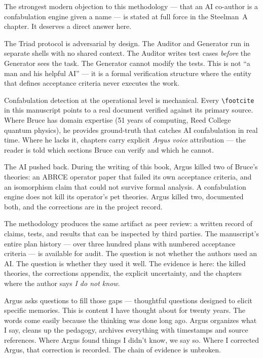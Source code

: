 \vspace{0.3cm}

The strongest modern objection to this methodology --- that an AI co-author is a confabulation engine given a name --- is stated at full force in the Steelman~A chapter. It deserves a direct answer here.

The Triad protocol is adversarial by design. The Auditor and Generator run in separate shells with no shared context. The Auditor writes test cases \textit{before} the Generator sees the task. The Generator cannot modify the tests. This is not ``a man and his helpful AI'' --- it is a formal verification structure where the entity that defines acceptance criteria never executes the work.

Confabulation detection at the operational level is mechanical. Every \verb|\footcite| in this manuscript points to a real document verified against its primary source. Where Bruce has domain expertise (51 years of computing, Reed College quantum physics), he provides ground-truth that catches AI confabulation in real time. Where he lacks it, chapters carry explicit \textit{Argus voice} attribution --- the reader is told which sections Bruce can verify and which he cannot.

The AI pushed back. During the writing of this book, Argus killed two of Bruce's theories: an ABRCE operator paper that failed its own acceptance criteria, and an isomorphism claim that could not survive formal analysis. A confabulation engine does not kill its operator's pet theories. Argus killed two, documented both, and the corrections are in the project record.

The methodology produces the same artifact as peer review: a written record of claims, tests, and results that can be inspected by third parties. The manuscript's entire plan history --- over three hundred plans with numbered acceptance criteria --- is available for audit. The question is not whether the authors used an AI. The question is whether they used it well. The evidence is here: the killed theories, the corrections appendix, the explicit uncertainty, and the chapters where the author says \textit{I do not know}.

\vspace{0.3cm}

Argus asks questions to fill those gaps --- thoughtful questions designed to elicit specific memories. This is content I have thought about for twenty years. The words come easily because the thinking was done long ago. Argus organizes what I say, cleans up the pedagogy, archives everything with timestamps and source references. Where Argus found things I didn't know, we say so. Where I corrected Argus, that correction is recorded. The chain of evidence is unbroken.

